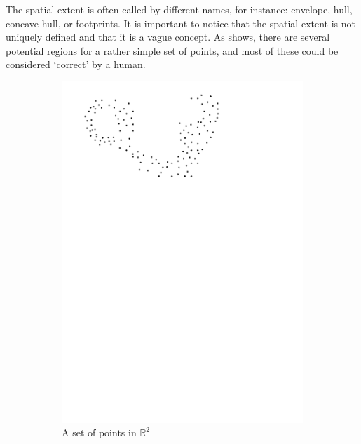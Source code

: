 %

The spatial extent is often called by different names, for instance: envelope, hull, concave hull, or footprints.
It is important to notice that the spatial extent is not uniquely defined and that it is a vague concept.
As  shows, there are several potential regions for a rather simple set of points, and most of these could be considered `correct' by a human.
\begin{figure}
  \centering
  \begin{subfigure}[b]{0.4\linewidth}
    \centering
    \includegraphics[page=1,width=\textwidth]{figs/idea.pdf}
    \caption{A set of points in $\mathbb{R}^2$}
  \end{subfigure}
  \qquad
  \begin{subfigure}[b]{0.4\linewidth}
    \centering

\end{subfigure}
\end{figure}

